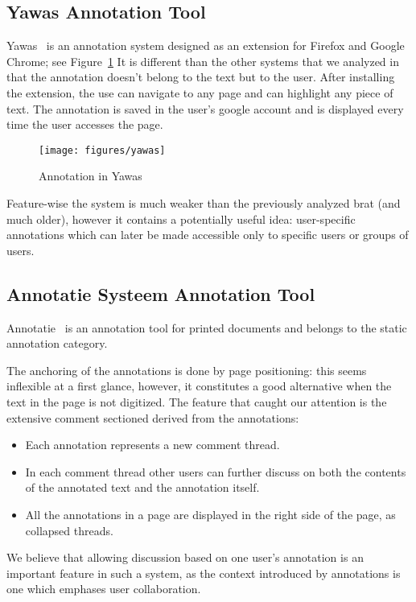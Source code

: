 \subsection{Yawas Annotation Tool} 
Yawas~\cite{yawas:on} is an annotation system designed as an extension for Firefox and
Google Chrome; see Figure~\ref{fig:yawas} It is different than the other systems that we
analyzed in that the annotation doesn't belong to the text but to the user. After
installing the extension, the use can navigate to any page and can highlight any piece of
text. The annotation is saved in the user's google account and is displayed every time the
user accesses the page.

\begin{figure}[ht]
  \texttt{[image: figures/yawas]}
  \caption{Annotation in Yawas}\label{fig:yawas}
\end{figure}

Feature-wise the system is much weaker than the previously analyzed brat (and much older),
however it contains a potentially useful idea: user-specific annotations which can later
be made accessible only to specific users or groups of users.

\subsection{Annotatie Systeem Annotation Tool} %
Annotatie~\cite{annotatie:on} is an annotation tool for printed
documents and belongs to the static annotation category.\vspace{10pt}

The anchoring of the annotations is done by page positioning: this seems inflexible at a
first glance, however, it constitutes a good alternative when the text in the page is not
digitized.  The feature that caught our attention is the extensive comment sectioned
derived from the annotations:
\begin{itemize}
\item Each annotation represents a new comment thread.
\item In each comment thread other users can further discuss on both the contents of the
  annotated text and the annotation itself.
\item All the annotations in a page are displayed in the right side of the page, as
  collapsed threads.
\end{itemize}
We believe that allowing discussion based on one user's annotation is an important feature
in such a system, as the context introduced by annotations is one which emphases user
collaboration.


